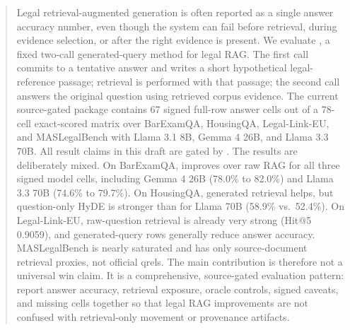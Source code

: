 \begin{abstract}
Legal retrieval-augmented generation is often reported as a single answer
accuracy number, even though the system can fail before retrieval, during
evidence selection, or after the right evidence is present. We evaluate
\hyre{}, a fixed two-call generated-query method for legal RAG. The first call
commits to a tentative answer and writes a short hypothetical legal-reference
passage; retrieval is performed with that passage; the second call answers the
original question using retrieved corpus evidence. The current source-gated
package contains 67 signed full-row answer cells out of a 78-cell exact-scored
matrix over BarExamQA, HousingQA, Legal-Link-EU, and MASLegalBench with Llama
3.1 8B, Gemma 4 26B, and Llama 3.3 70B. All result claims in this draft are
gated by \claimgate. The results are deliberately mixed. On BarExamQA,
\hyre{} improves over raw RAG for all three signed model cells, including Gemma
4 26B (78.0\% to 82.0\%) and Llama 3.3 70B (74.6\% to 79.7\%). On HousingQA,
generated retrieval helps, but question-only HyDE is stronger than \hyre{} for
Llama 70B (58.9\% vs.\ 52.4\%). On Legal-Link-EU, raw-question retrieval is
already very strong (Hit@5 0.9059), and generated-query rows generally reduce
answer accuracy. MASLegalBench is nearly saturated and has only source-document
retrieval proxies, not official qrels. The main contribution is therefore not a
universal win claim. It is a comprehensive, source-gated evaluation pattern:
report answer accuracy, retrieval exposure, oracle controls, signed caveats,
and missing cells together so that legal RAG improvements are not confused with
retrieval-only movement or provenance artifacts.
\end{abstract}
